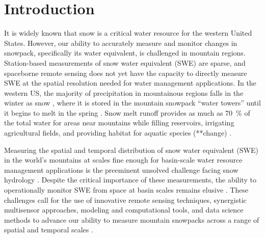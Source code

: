 
\hypertarget{ch1}{%
\chapter{Introduction}\label{ch1}}


It is widely known that snow is a critical water resource for the western United States. 
However, our ability to accurately measure and monitor changes in snowpack, specifically its water equivalent, is challenged in mountain regions. Station-based measurements of snow water equivalent (SWE) are sparse, and spaceborne remote sensing does not yet have the capacity to directly measure SWE at the spatial resolution needed for water management applications. 
In the western US, the majority of precipitation in mountainous regions falls in the winter as snow \citep{serrezeCharacteristicsWesternUnited1999}, where it is stored in the mountain snowpack “water towers” until it begins to melt in the spring \citep{immerzeelImportanceVulnerabilityWorld2020,viviroliIncreasingDependenceLowland2020}. Snow melt runoff provides as much as 70~\% of the total water for areas near mountains \citep{liHowMuchRunoff2017} while filling reservoirs, irrigating agricultural fields, and providing habitat for aquatic species (**change) \citep{yarnellEcologyManagementSpring2010}. 

Measuring the spatial and temporal distribution of snow water equivalent (SWE) in the world’s mountains at scales fine enough for basin-scale water resource management applications is the preeminent unsolved challenge facing snow hydrology \citep{dozierEstimatingSpatialDistribution2016}. Despite the critical importance of these measurements, the ability to operationally monitor SWE from space at basin scales remains elusive \citep{lettenmaierInroadsRemoteSensing2015}. These challenges call for the use of innovative remote sensing techniques, synergistic multisensor approaches, modeling and computational tools, and data science methods to advance our ability to measure mountain snowpacks across a range of spatial and temporal scales \citep{dozierMountainHydrologySnow2011}. 

